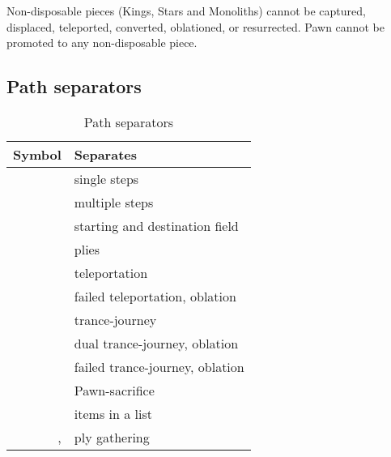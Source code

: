 Non-disposable pieces (Kings, Stars and Monoliths) cannot be captured, displaced,
teleported, converted, oblationed, or resurrected. Pawn cannot be promoted to
any non-disposable piece.

\clearpage %

\subsection*{Path separators}
\label{sec:Appendix/Summary/Path separators}

\begin{table}[!h]
\centering
\begin{tabular}{ rl }
\toprule %
\textbf{Symbol}      & \textbf{Separates}                         \\
\midrule %
\alg{.}              & single steps                               \\
\alg{..}             & multiple steps                             \\
\alg{-}              & starting and destination field             \\
\cmidrule{1-2} %
\alg{\~{}}           & plies                                      \\
\alg{|}              & teleportation                              \\
\alg{||}             & failed teleportation, oblation             \\
\alg{@}              & trance-journey                             \\
\alg{@@}             & dual trance-journey, oblation              \\
\alg{@@@}            & failed trance-journey, oblation            \\
\alg{;;}             & Pawn-sacrifice                             \\
\cmidrule{1-2} %
\alg{,}              & items in a list                            \\
\alg{[}, \alg{]}     & ply gathering                              \\
\bottomrule %
\end{tabular}
\caption{Path separators}
\label{tbl:Appendix/Summary/Path separators}
\end{table}

